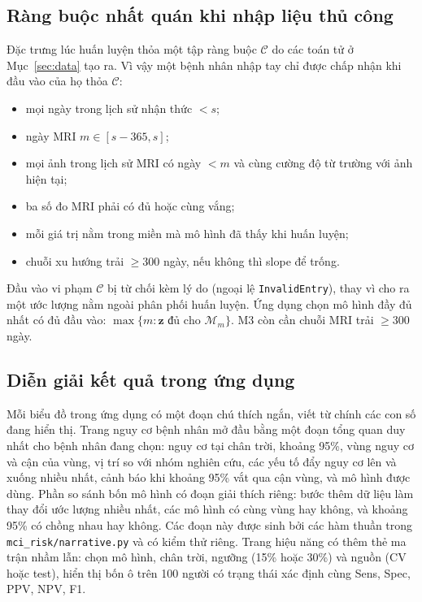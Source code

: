 \documentclass[journal]{IEEEtran}
\newcommand{\code}[1]{\texttt{#1}}
\begin{document}
\subsection{Ràng buộc nhất quán khi nhập liệu thủ công}
Đặc trưng lúc huấn luyện thỏa một tập ràng buộc $\mathcal C$ do các toán tử ở Mục~\ref{sec:data} tạo ra. Vì vậy một bệnh nhân nhập tay chỉ được chấp nhận khi đầu vào của họ thỏa $\mathcal C$:
\begin{itemize}
\item mọi ngày trong lịch sử nhận thức $<s$;
\item ngày MRI $m\in[s-365,s]$;
\item mọi ảnh trong lịch sử MRI có ngày $<m$ và cùng cường độ từ trường với ảnh hiện tại;
\item ba số đo MRI phải có đủ hoặc cùng vắng;
\item mỗi giá trị nằm trong miền mà mô hình đã thấy khi huấn luyện;
\item chuỗi xu hướng trải $\ge300$ ngày, nếu không thì slope để trống.
\end{itemize}
Đầu vào vi phạm $\mathcal C$ bị từ chối kèm lý do (ngoại lệ \code{InvalidEntry}), thay vì cho ra một ước lượng nằm ngoài phân phối huấn luyện. Ứng dụng chọn mô hình đầy đủ nhất có đủ đầu vào: $\max\{m:\bm z\text{ đủ cho }\mathcal M_m\}$. M3 còn cần chuỗi MRI trải $\ge300$ ngày.

\subsection{Diễn giải kết quả trong ứng dụng}
Mỗi biểu đồ trong ứng dụng có một đoạn chú thích ngắn, viết từ chính các con số đang hiển thị. Trang nguy cơ bệnh nhân mở đầu bằng một đoạn tổng quan duy nhất cho bệnh nhân đang chọn: nguy cơ tại chân trời, khoảng 95\%, vùng nguy cơ và cận của vùng, vị trí so với nhóm nghiên cứu, các yếu tố đẩy nguy cơ lên và xuống nhiều nhất, cảnh báo khi khoảng 95\% vắt qua cận vùng, và mô hình được dùng. Phần so sánh bốn mô hình có đoạn giải thích riêng: bước thêm dữ liệu làm thay đổi ước lượng nhiều nhất, các mô hình có cùng vùng hay không, và khoảng 95\% có chồng nhau hay không. Các đoạn này được sinh bởi các hàm thuần trong \code{mci\_risk/narrative.py} và có kiểm thử riêng. Trang hiệu năng có thêm thẻ ma trận nhầm lẫn: chọn mô hình, chân trời, ngưỡng (15\% hoặc 30\%) và nguồn (CV hoặc test), hiển thị bốn ô trên 100 người có trạng thái xác định cùng Sens, Spec, PPV, NPV, F1.
\end{document}
